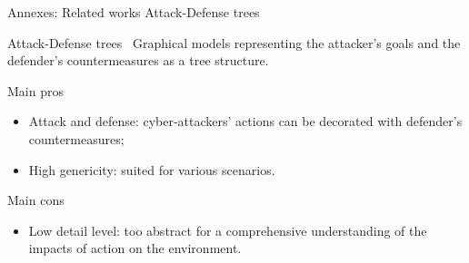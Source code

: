 	\begin{frame}{Annexes: Related works}
		{Attack-Defense trees}

            \begin{block}{Attack-Defense trees~\cite{BKordy2010}}
                Graphical models representing the attacker's goals and the defender's countermeasures as a tree structure.
            \end{block}

            \begin{prosblock}{Main pros}
                \begin{itemize}
                    \item Attack and defense: cyber-attackers' actions can be decorated with defender's countermeasures;
                    \item High genericity: suited for various scenarios.
                \end{itemize}
            \end{prosblock}

            \begin{consblock}{Main cons}
                \begin{itemize}
                    \item Low detail level: too abstract for a comprehensive understanding of the impacts of action on the environment.
                \end{itemize}
            \end{consblock}

	\end{frame}

